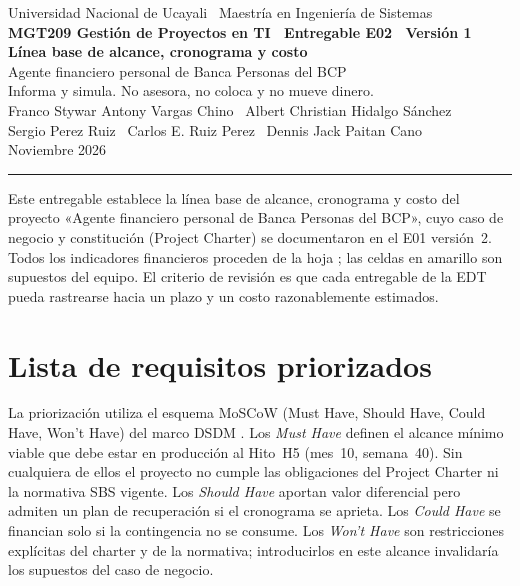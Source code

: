 \documentclass[11pt]{article}
\begin{document}
\begin{center}
{\color{bcp}\small Universidad Nacional de Ucayali \textperiodcentered\ Maestría en Ingeniería de Sistemas}\\[0.3em]
{\color{cobre}\bfseries\small MGT209 Gestión de Proyectos en TI \textperiodcentered\ Entregable E02 \textperiodcentered\ Versión 1}\\[0.6em]
{\color{bcp}\LARGE\bfseries Línea base de alcance, cronograma y costo}\\[0.3em]
{\large Agente financiero personal de Banca Personas del BCP}\\[0.15em]
{\normalsize Informa y simula. No asesora, no coloca y no mueve dinero.}\\[0.45em]
{\small Franco Stywar Antony Vargas Chino \textperiodcentered\ Albert Christian Hidalgo Sánchez}\\[0.15em]
{\small Sergio Perez Ruiz \textperiodcentered\ Carlos E. Ruiz Perez \textperiodcentered\ Dennis Jack Paitan Cano}\\[0.3em]
{\small Noviembre 2026}
\end{center}

\vspace{0.2em}
{\color{cobre}\rule{\textwidth}{0.6pt}}

Este entregable establece la línea base de alcance, cronograma y costo del proyecto «Agente financiero personal de Banca Personas del BCP», cuyo caso de negocio y constitución (Project Charter) se documentaron en el E01 versión~2. Todos los indicadores financieros proceden de la hoja ; las celdas en amarillo son supuestos del equipo. El criterio de revisión es que cada entregable de la EDT pueda rastrearse hacia un plazo y un costo razonablemente estimados.

\section{Lista de requisitos priorizados}

La priorización utiliza el esquema MoSCoW (Must Have, Should Have, Could Have, Won't Have) del marco DSDM \cite{dsdm}. Los \textit{Must Have} definen el alcance mínimo viable que debe estar en producción al Hito~H5 (mes~10, semana~40). Sin cualquiera de ellos el proyecto no cumple las obligaciones del Project Charter ni la normativa SBS vigente. Los \textit{Should Have} aportan valor diferencial pero admiten un plan de recuperación si el cronograma se aprieta. Los \textit{Could Have} se financian solo si la contingencia no se consume. Los \textit{Won't Have} son restricciones explícitas del charter y de la normativa; introducirlos en este alcance invalidaría los supuestos del caso de negocio.
\end{document}
